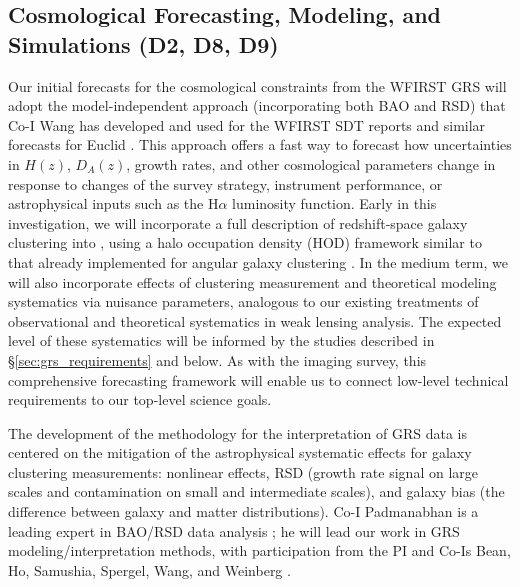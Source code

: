\subsection{Cosmological Forecasting, Modeling, and Simulations (D2, D8, D9)}
\label{sec:cmethods}

 Our initial forecasts for the cosmological constraints from
the WFIRST GRS will adopt the model-independent approach (incorporating
both BAO and RSD) that Co-I Wang has developed \cite{Wang2013} and
used for the WFIRST SDT reports and similar forecasts for Euclid \cite{WangEuclid2010}.
This approach offers a fast way to forecast how uncertainties in
$H(z)$, $D_A(z)$, growth rates, and other cosmological parameters
change in response to changes of the survey strategy, instrument
performance, or astrophysical inputs such as the H$\alpha$ luminosity
function.  Early in this investigation, we will incorporate a full description
of redshift-space galaxy clustering into \CoLi, using a halo
occupation density (HOD) framework similar to that already implemented for
angular galaxy clustering \cite{Krause2013}.  In the medium term, we will also
incorporate effects of clustering measurement and theoretical
modeling systematics via nuisance parameters, analogous to our
existing treatments of observational and theoretical systematics
in weak lensing analysis.  The expected level of these systematics
will be informed by the studies described in \S\ref{sec:grs_requirements}
and below.  As with the imaging survey, this comprehensive forecasting
framework will enable us to connect low-level technical requirements
to our top-level science goals.

 The development of the methodology for the
interpretation of GRS data is centered on the mitigation of the
astrophysical systematic effects  for galaxy clustering measurements:
nonlinear effects, RSD (growth rate signal on large scales and
contamination on small and intermediate scales),  and galaxy bias (the
difference between galaxy and matter distributions).
Co-I Padmanabhan is a leading expert in BAO/RSD data analysis \cite{Padmanabhan2007,Padmanabhan2008,Padmanabhan2009,Padmanabhan2012,Xu2012}; he will lead our
work in GRS modeling/interpretation methods, with participation from the PI and Co-Is
Bean, Ho, Samushia, Spergel, Wang, and Weinberg \cite{CW12,Ho2012,Anderson2014,Wang2014,Osumi2015,Alam2015a,Alam2015b,Cuesta2015}.


